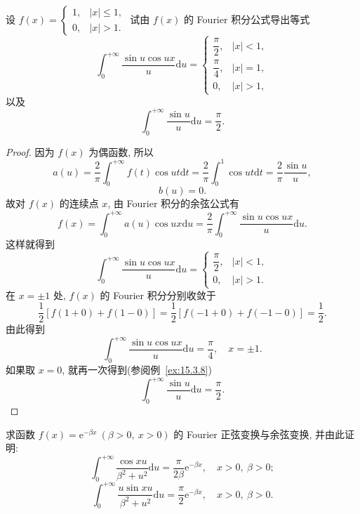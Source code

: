 \begin{example}\label{ex:16.3.1}
设 $f(x)=\begin{cases}1,&|x|\leqslant1,\\0,&|x|>1.\end{cases}$ 试由 $f(x)$ 的 Fourier 积分公式导出等式
\[
  \int_{0}^{+\infty}\frac{\sin u\cos ux}{u}\mathrm{d}u=
  \begin{cases}
    \dfrac{\pi}{2},&|x|<1,\\[4pt]
    \dfrac{\pi}{4},&|x|=1,\\[4pt]
    0,&|x|>1,
\end{cases}
\]
以及
\[
  \int_{0}^{+\infty}\frac{\sin u}{u}\mathrm{d}u=\frac{\pi}{2}.
\]
\end{example}

\begin{proof}
因为 $f(x)$ 为偶函数, 所以
\[
  a(u)=\frac{2}{\pi}\int_{0}^{+\infty}f(t)\cos ut\mathrm{d}t=\frac{2}{\pi}\int_{0}^{1}\cos ut\mathrm{d}t=\frac{2}{\pi}\frac{\sin u}{u},
\]
\[
  b(u)=0.
\]
故对 $f(x)$ 的连续点 $x$, 由 Fourier 积分的余弦公式有
\[
  f(x)=\int_{0}^{+\infty}a(u)\cos ux\mathrm{d}u=\frac{2}{\pi}\int_{0}^{+\infty}\frac{\sin u\cos ux}{u}\mathrm{d}u.
\]
这样就得到
\[
  \int_{0}^{+\infty}\frac{\sin u\cos ux}{u}\mathrm{d}u=
  \begin{cases}
    \dfrac{\pi}{2},&|x|<1,\\[4pt]
    0,&|x|>1.
\end{cases}
\]
在 $x=\pm1$ 处, $f(x)$ 的 Fourier 积分分别收敛于
\[
  \frac{1}{2}[f(1+0)+f(1-0)]=\frac{1}{2}[f(-1+0)+f(-1-0)]=\frac{1}{2}.
\]
由此得到
\[
  \int_{0}^{+\infty}\frac{\sin u\cos ux}{u}\mathrm{d}u=\frac{\pi}{4},\quad x=\pm1.
\]
如果取 $x=0$, 就再一次得到(参阅例~\ref{ex:15.3.8})
\[
  \int_{0}^{+\infty}\frac{\sin u}{u}\mathrm{d}u=\frac{\pi}{2}.
\]
\end{proof}

\begin{example}\label{ex:16.3.2}
求函数 $f(x)=\mathrm{e}^{-\beta x}\ (\beta>0,\ x>0)$ 的 Fourier 正弦变换与余弦变换, 并由此证明:
\[
  \int_{0}^{+\infty}\frac{\cos xu}{\beta^{2}+u^{2}}\mathrm{d}u=\frac{\pi}{2\beta}\mathrm{e}^{-\beta x},\quad x>0,\ \beta>0;
\]
\[
  \int_{0}^{+\infty}\frac{u\sin xu}{\beta^{2}+u^{2}}\mathrm{d}u=\frac{\pi}{2}\mathrm{e}^{-\beta x},\quad x>0,\ \beta>0.
\]
\end{example}

